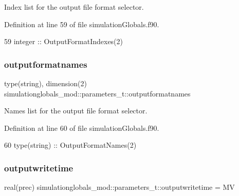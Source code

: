 Index list for the output file format selector. 



Definition at line 59 of file simulation\+Globals.\+f90.


\begin{DoxyCode}
59         \textcolor{keywordtype}{integer}         :: OutputFormatIndexes(2)
\end{DoxyCode}
\mbox{\label{structsimulationglobals__mod_1_1parameters__t_a75f99aae482ed1092b84b5bbff494d99}} 
\subsubsection{\texorpdfstring{outputformatnames}{outputformatnames}}
{\footnotesize\ttfamily type(string), dimension(2) simulationglobals\+\_\+mod\+::parameters\+\_\+t\+::outputformatnames\hspace{0.3cm}{\ttfamily [private]}}



Names list for the output file format selector. 



Definition at line 60 of file simulation\+Globals.\+f90.


\begin{DoxyCode}
60         \textcolor{keywordtype}{type}(string)    :: OutputFormatNames(2)
\end{DoxyCode}
\mbox{\label{structsimulationglobals__mod_1_1parameters__t_a283fe10ad9daf8ffe2ca526ee990daa9}} 
\subsubsection{\texorpdfstring{outputwritetime}{outputwritetime}}
{\footnotesize\ttfamily real(prec) simulationglobals\+\_\+mod\+::parameters\+\_\+t\+::outputwritetime = MV\hspace{0.3cm}{\ttfamily [private]}}



